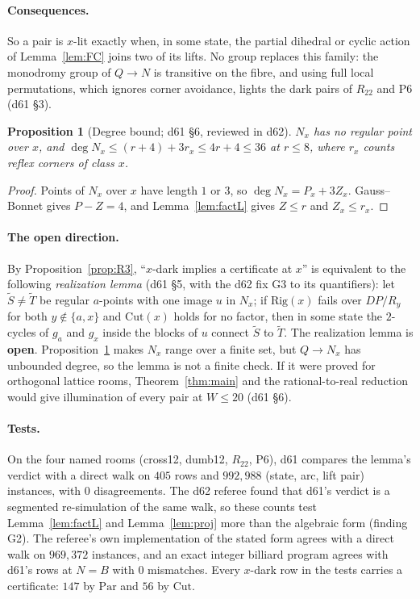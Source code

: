 \documentclass[11pt]{article}
\newtheorem{proposition}{Proposition}
\theoremstyle{definition}
\theoremstyle{remark}
\newcommand{\Par}{\mathrm{Par}}
\newcommand{\Rig}{\mathrm{Rig}}
\newcommand{\Cut}{\mathrm{Cut}}
\newcommand{\Rr}{R_{22}}
\begin{document}
\paragraph{Consequences.}
So a pair is $x$-lit exactly when, in some state, the partial dihedral or
cyclic action of Lemma~\ref{lem:FC} joins two of its lifts. No group replaces
this family: the monodromy group of $Q\to N$ is transitive on the fibre, and
using full local permutations, which ignores corner avoidance, lights the dark
pairs of $\Rr$ and P6 (d61 \S3).

\begin{proposition}[Degree bound; d61 \S6, reviewed in d62]\label{prop:degN}
$N_x$ has no regular point over $x$, and
$\deg N_x\le (r+4)+3r_x\le 4r+4\le 36$ at $r\le 8$, where $r_x$ counts reflex
corners of class $x$.
\end{proposition}
\begin{proof}
Points of $N_x$ over $x$ have length $1$ or $3$, so $\deg N_x=P_x+3Z_x$.
Gauss--Bonnet gives $P-Z=4$, and Lemma~\ref{lem:factL} gives $Z\le r$ and
$Z_x\le r_x$.
\end{proof}

\paragraph{The open direction.}
By Proposition~\ref{prop:R3}, ``$x$-dark implies a certificate at $x$'' is
equivalent to the following \emph{realization lemma} (d61 \S5, with the d62
fix G3 to its quantifiers): let $\tilde S\ne\tilde T$ be regular $a$-points with
one image $u$ in $N_x$; if $\Rig(x)$ fails over $DP/R_y$ for both
$y\notin\{a,x\}$ and $\Cut(x)$ holds for no factor, then in some state the
$2$-cycles of $g_a$ and $g_x$ inside the blocks of $u$ connect $\tilde S$ to
$\tilde T$. The realization lemma is \textbf{open}. Proposition~\ref{prop:degN}
makes $N_x$ range over a finite set, but $Q\to N_x$ has unbounded degree, so
the lemma is not a finite check. If it were proved for orthogonal lattice rooms,
Theorem~\ref{thm:main} and the rational-to-real reduction \cite{RR} would give
illumination of every pair at $W\le 20$ (d61 \S6).

\paragraph{Tests.}
On the four named rooms (cross12, dumb12, $\Rr$, P6), d61 compares the lemma's
verdict with a direct walk on $405$ rows and $992{,}988$ (state, arc, lift pair)
instances, with $0$ disagreements. The d62 referee found that d61's verdict is
a segmented re-simulation of the same walk, so these counts test
Lemma~\ref{lem:factL} and Lemma~\ref{lem:proj} more than the algebraic form
(finding G2). The referee's own implementation of the stated form agrees with a
direct walk on $969{,}372$ instances, and an exact integer billiard program
agrees with d61's rows at $N=B$ with $0$ mismatches. Every $x$-dark row in the
tests carries a certificate: $147$ by $\Par$ and $56$ by $\Cut$.
\end{document}
